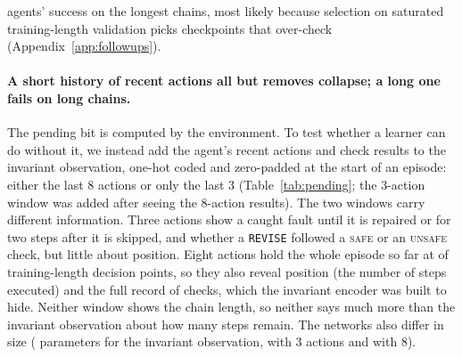 agents' success on the longest chains, most likely because selection on saturated training-length validation picks checkpoints that over-check (Appendix~\ref{app:followups}).

\paragraph{A short history of recent actions all but removes collapse; a long one fails on long chains.}
The pending bit is computed by the environment. To test whether a learner can do without it, we instead add the agent's recent actions and check results to the invariant observation, one-hot coded and zero-padded at the start of an episode: either the last 8 actions or only the last 3 (Table~\ref{tab:pending}; the 3-action window was added after seeing the 8-action results). The two windows carry different information. Three actions show a caught fault until it is repaired or for two steps after it is skipped, and whether a \texttt{REVISE} followed a \textsc{safe} or an \textsc{unsafe} check, but little about position. Eight actions hold the whole episode so far at  of training-length decision points, so they also reveal position (the number of steps executed) and the full record of checks, which the invariant encoder was built to hide. Neither window shows the chain length, so neither says much more than the invariant observation about how many steps remain. The networks also differ in size ( parameters for the invariant observation,  with 3 actions and  with 8).

